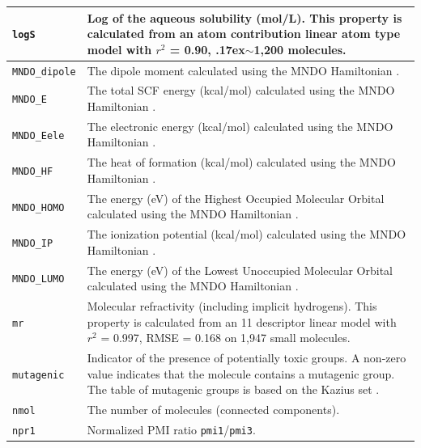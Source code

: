 \documentclass[12pt,a4paper]{article}
\begin{document}
\begin{longtable}{@{\zz}|p{}|p{}|}
\texttt{logS} & Log of the aqueous solubility (mol/L). This property is 
calculated from an atom contribution linear atom type model \cite{Hou2004} 
with $r^2$ = 0.90, {\raise.17ex\hbox{$\scriptstyle\sim$}}1,200 molecules.\\ \hline

\texttt{MNDO\_dipole} & The dipole moment calculated using the MNDO Hamiltonian 
\cite{MOPAC1993}.\\ \hline

\texttt{MNDO\_E} & The total SCF energy (kcal/mol) calculated using the MNDO 
Hamiltonian \cite{MOPAC1993}.\\ \hline

\texttt{MNDO\_Eele} & The electronic energy (kcal/mol) calculated using the 
MNDO Hamiltonian \cite{MOPAC1993}.\\ \hline

\texttt{MNDO\_HF} & The heat of formation (kcal/mol) calculated using the MNDO 
Hamiltonian \cite{MOPAC1993}.\\ \hline

\texttt{MNDO\_HOMO} & The energy (eV) of the Highest Occupied Molecular 
Orbital calculated using the MNDO Hamiltonian \cite{MOPAC1993}.\\ \hline

\texttt{MNDO\_IP} & The ionization potential (kcal/mol) calculated using the 
MNDO Hamiltonian \cite{MOPAC1993}.\\ \hline

\texttt{MNDO\_LUMO} & The energy (eV) of the Lowest Unoccupied Molecular 
Orbital calculated using the MNDO Hamiltonian \cite{MOPAC1993}.\\ \hline

\texttt{mr} & Molecular refractivity (including implicit hydrogens). This 
property is calculated from an 11 descriptor linear model \cite{MREF1998} 
with $r^2$ = 0.997, RMSE = 0.168 on 1,947 small molecules.\\ \hline

\texttt{mutagenic} & Indicator of the presence of potentially toxic groups. 
A non-zero value indicates that the molecule contains a mutagenic group. 
The table of mutagenic groups is based on the Kazius set \cite{Kazius2005}.\\ 
\hline

\texttt{nmol} & The number of molecules (connected components).\\ \hline

\texttt{npr1} & Normalized PMI ratio \texttt{pmi1}/\texttt{pmi3}.\\ \hline


\end{longtable}
\end{document}
